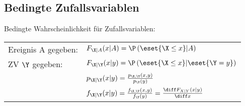 \documentclass[german,color,6pt]{latex4ei/latex4ei_sheet}
\begin{document}
\begin{sectionbox}
	\subsection{Bedingte Zufallsvariablen}
	Bedingte Wahrscheinlichkeit für Zufallsvariablen:\\
	\begin{tabular}{ll}
		Ereignis A gegeben: & $F_{\X|A}(x|A) = \P\left(\eset{\X \le x} | A\right)$\\
		ZV $\Y$ gegeben: & $F_{\X|\Y}(x|y)= \P\left(\eset{\X \le x} | \eset{\Y = y}\right)$\\
		& $p_{\X|\Y}(x|y) = \frac{p_{\X,\Y}(x,y)}{p_{\Y}(y)}$\\
		& $f_{\X|\Y}(x|y) = \frac{f_{\X,\Y}(x,y)}{f_{\Y}(y)} = \frac{\diff F_{X|Y}(x|y)}{\diff x}$
	\end{tabular}

\end{sectionbox}
\vspace{-0.3cm}
\end{document}
